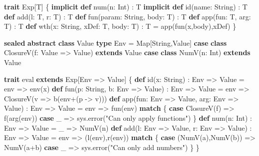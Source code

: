 \documentclass[]{article}
\newenvironment{Shaded}{}{}
\newcommand{\FunctionTok}[1]{\textcolor[rgb]{0.02,0.16,0.49}{#1}}
\newcommand{\KeywordTok}[1]{\textcolor[rgb]{0.00,0.44,0.13}{\textbf{#1}}}
\newcommand{\NormalTok}[1]{#1}
\newcommand{\StringTok}[1]{\textcolor[rgb]{0.25,0.44,0.63}{#1}}
\begin{document}
\begin{Shaded}
\begin{Highlighting}[]
\KeywordTok{trait}\NormalTok{ Exp[T] \{}
  \KeywordTok{implicit} \KeywordTok{def} \FunctionTok{num}\NormalTok{(n: Int) : T}
  \KeywordTok{implicit} \KeywordTok{def} \FunctionTok{id}\NormalTok{(name: String) : T}
  \KeywordTok{def} \FunctionTok{add}\NormalTok{(l: T, r: T) : T}
  \KeywordTok{def} \FunctionTok{fun}\NormalTok{(param: String, body: T) : T}
  \KeywordTok{def} \FunctionTok{app}\NormalTok{(fun: T, arg: T) : T}
  \KeywordTok{def} \FunctionTok{wth}\NormalTok{(x: String, xDef: T, body: T) : T = }\FunctionTok{app}\NormalTok{(}\FunctionTok{fun}\NormalTok{(x,body),xDef)}
\NormalTok{\}}

\KeywordTok{sealed} \KeywordTok{abstract} \KeywordTok{class}\NormalTok{ Value}
\KeywordTok{type}\NormalTok{ Env = Map[String,Value]}
\KeywordTok{case} \KeywordTok{class} \FunctionTok{ClosureV}\NormalTok{(f: Value =\textgreater{} Value) }\KeywordTok{extends}\NormalTok{ Value}
\KeywordTok{case} \KeywordTok{class} \FunctionTok{NumV}\NormalTok{(n: Int) }\KeywordTok{extends}\NormalTok{ Value}

\KeywordTok{trait}\NormalTok{ eval }\KeywordTok{extends}\NormalTok{ Exp[Env =\textgreater{} Value] \{}
  \KeywordTok{def} \FunctionTok{id}\NormalTok{(x: String) : Env =\textgreater{} Value = env =\textgreater{} }\FunctionTok{env}\NormalTok{(x)}
  \KeywordTok{def} \FunctionTok{fun}\NormalTok{(p: String, b: Env =\textgreater{} Value) : Env =\textgreater{} Value =}
\NormalTok{    env =\textgreater{} }\FunctionTok{ClosureV}\NormalTok{(v =\textgreater{} }\FunctionTok{b}\NormalTok{(env+(p {-}\textgreater{} v)))}
  \KeywordTok{def} \FunctionTok{app}\NormalTok{(fun: Env =\textgreater{} Value, arg: Env =\textgreater{} Value) : Env =\textgreater{} Value =}
\NormalTok{    env =\textgreater{} }\FunctionTok{fun}\NormalTok{(env) }\KeywordTok{match}\NormalTok{ \{}
      \KeywordTok{case} \FunctionTok{ClosureV}\NormalTok{(f) =\textgreater{} }\FunctionTok{f}\NormalTok{(}\FunctionTok{arg}\NormalTok{(env))}
      \KeywordTok{case}\NormalTok{ \_ =\textgreater{} sys.}\FunctionTok{error}\NormalTok{(}\StringTok{"Can only apply functions"}\NormalTok{)}
\NormalTok{    \}}
  \KeywordTok{def} \FunctionTok{num}\NormalTok{(n: Int) : Env =\textgreater{} Value = \_ =\textgreater{} }\FunctionTok{NumV}\NormalTok{(n)}
  \KeywordTok{def} \FunctionTok{add}\NormalTok{(l: Env =\textgreater{} Value, r: Env =\textgreater{} Value) : Env =\textgreater{} Value =}
\NormalTok{    env =\textgreater{} (}\FunctionTok{l}\NormalTok{(env),}\FunctionTok{r}\NormalTok{(env)) }\KeywordTok{match}\NormalTok{ \{}
      \KeywordTok{case}\NormalTok{ (}\FunctionTok{NumV}\NormalTok{(a),}\FunctionTok{NumV}\NormalTok{(b)) =\textgreater{} }\FunctionTok{NumV}\NormalTok{(a+b)}
      \KeywordTok{case}\NormalTok{ \_ =\textgreater{} sys.}\FunctionTok{error}\NormalTok{(}\StringTok{"Can only add numbers"}\NormalTok{)}
\NormalTok{    \}}
\NormalTok{\}}


\end{Highlighting}
\end{Shaded}
\end{document}
